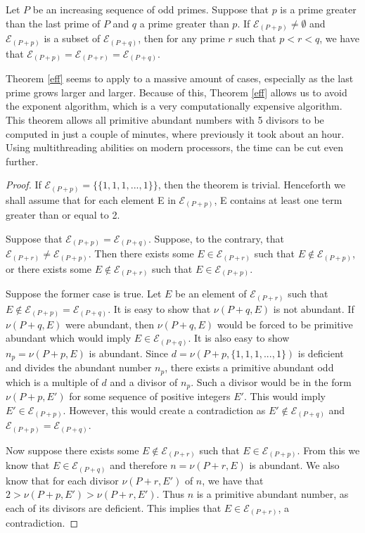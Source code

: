 \documentclass[../paper.tex]{subfiles}
\begin{document}
\begin{theorem} \label{eff}
Let $P$ be an increasing sequence of odd primes. Suppose
that $p$ is a prime greater than the last prime of $P$ and $q$ a
prime greater than $p$. If $\mathcal{E}_{(P + p)} \neq 
\emptyset$ and $\mathcal{E}_{(P + p)}$ is a subset of 
$\mathcal{E}_{(P + q)}$, then for any prime $r$ such that $p <
r < q$, we have that $\mathcal{E}_{(P + p)} = \mathcal{E}_{(P +
r)} = \mathcal{E}_{(P + q)}$.
\end{theorem}

Theorem {\ref{eff}} seems to apply to a massive amount of cases,
especially as the last prime grows larger and larger. Because of
this, Theorem {\ref{eff}} allows us to avoid the exponent algorithm,
which is a very computationally expensive algorithm. This theorem
allows all primitive abundant numbers with 5 divisors to be
computed in just a couple of minutes, where previously it took
about an hour. Using multithreading abilities on modern
processors, the time can be cut even further.

\begin{proof}
If $\mathcal{E}_{(P + p)} = \{\{1,1,1, ..., 1\}\}$, then the
theorem is trivial. Henceforth we shall assume that for each 
element E in $\mathcal{E}_{(P + p)}$, E contains at least one term
greater than or equal to 2.

Suppose that $\mathcal{E}_{(P + p)} = \mathcal{E}_{(P + q)}$.
Suppose, to the contrary, that $\mathcal{E}_{(P+r)} \neq
\mathcal{E}_{(P + p)}$. Then there exists some $E \in
\mathcal{E}_{(P + r)}$ such that $E \notin \mathcal{E}_{(P + p)}$, or there
exists some $E \notin \mathcal{E}_{(P + r)}$ such that 
$E \in \mathcal{E}_{(P + p)}$. 

Suppose the former case is true. Let $E$ be an element of
$\mathcal{E}_{(P + r)}$ such that $E \notin \mathcal{E}_{(P + p)} =
\mathcal{E}_{(P + q)}$. It is easy to show that $\nu(P + q, E)$ is
not abundant. If $\nu(P + q, E)$ were abundant, then $\nu(P + q,
E)$ would be forced to be primitive abundant which would imply 
$E \in \mathcal{E}_{(P + q)}$. It is also easy to show 
$n_p = \nu(P + p, E)$ is abundant. Since $d = \nu (P + p,
\{1,1,1,...,1\})$ is deficient and divides the abundant number $n_p$, 
there exists a primitive abundant odd which is a multiple of $d$
and a divisor of $n_p$. Such a divisor would be in the form $\nu(P
+ p, E')$ for some sequence of positive integers $E'$. This would
imply $E' \in \mathcal{E}_{(P + p)}$. However, this would create a
contradiction as $E' \notin \mathcal{E}_{(P + q)}$ and
$\mathcal{E}_{(P + p)} = \mathcal{E}_{(P + q)}$. 

Now suppose there exists some $E \notin \mathcal{E}_{(P + r)}$ 
such that $E \in \mathcal{E}_{(P + p)}$. From this we know that
$E \in \mathcal{E}_{(P + q)}$ and therefore $n = \nu (P + r, E)$ is
abundant. We also know that for each divisor $\nu (P + r, E')$ of
$n$, we have that $2 > \nu (P + p, E') > \nu(P + r, E')$. Thus $n$
is a primitive abundant number, as each of its divisors are
deficient. This implies that $E \in \mathcal{E}_{(P + r)}$, a contradiction.
\end{proof}
\end{document}
